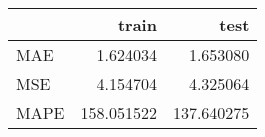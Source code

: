 \begin{tabular}{lrr}
\toprule
{} &       train &        test \\
\midrule
MAE  &    1.624034 &    1.653080 \\
MSE  &    4.154704 &    4.325064 \\
MAPE &  158.051522 &  137.640275 \\
\bottomrule
\end{tabular}
